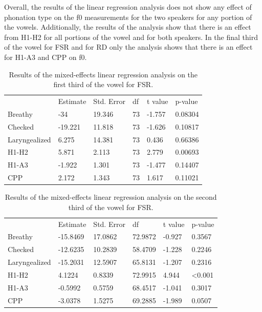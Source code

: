 \documentclass[12pt, letterpaper]{article}
\providecommand{\lsptoprule}{\midrule\toprule}
\providecommand{\lspbottomrule}{\bottomrule\midrule}
\begin{document}
Overall, the results of the linear regression analysis does not show any effect of phonation type on the f0 measurements for the two speakers for any portion of the vowels. Additionally, the results of the analysis show that there is an effect from H1-H2 for all portions of the vowel and for both speakers. In the final third of the vowel for FSR and for RD only the analysis shows that there is an effect for H1-A3 and CPP on f0.

\begin{table}[!h]
	\centering
	\caption{Results of the mixed-effects linear regression analysis on the first third of the vowel for FSR. }
	\label{tab:First}
	 \begin{tabular}{llllll}
	  \lsptoprule
						&  Estimate  & Std. Error & df & t value & p-value \\
	  	Breathy   		&  -34  	&  19.346	& 73 	& -1.757 	& 0.08304 \\
		Checked    		&  -19.221 	&  11.818	& 73 	& -1.626 	& 0.10817 \\
		Laryngealized	& 6.275		&  14.381	& 73	& 0.436 	& 0.66386 \\
		H1-H2			& 5.871		&  2.113	& 73	& 2.779 	& 0.00693 \\
		H1-A3			& -1.922 	&  1.301	& 73	& -1.477	& 0.14407 \\
		CPP				& 2.172		&  1.343	& 73	& 1.617		& 0.11021 \\
	  \lspbottomrule
	 \end{tabular}
\end{table}

\begin{table}[!h]
	\centering
	\caption{Results of the mixed-effects linear regression analysis on the second third of the vowel for FSR. }
	\label{tab:Second}
	 \begin{tabular}{llllll}
	  \lsptoprule
						&  Estimate  & Std. Error & df & t value & p-value \\
	  	Breathy   		& -15.8469 	& 17.0862	& 72.9872 	& -0.927 	& 0.3567\\
		Checked    		& -12.6235	& 10.2839	& 58.4709	& -1.228 	& 0.2246 \\
		Laryngealized	& -15.2031	& 12.5907	& 65.8131	& -1.207	& 0.2316 \\
		H1-H2			& 4.1224	& 0.8339	& 72.9915	& 4.944		& <0.001\\
		H1-A3			& -0.5992	& 0.5759	& 68.4517	& -1.041	& 0.3017\\
		CPP				& -3.0378	& 1.5275	& 69.2885	& -1.989	& 0.0507\\
	  \lspbottomrule
	 \end{tabular}
\end{table}
\end{document}
